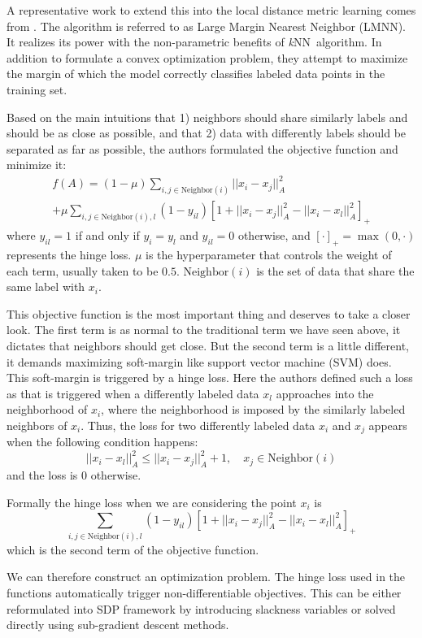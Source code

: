 \documentclass[12pt]{article}
\newcommand{\knn}{\textit{k}NN}
\begin{document}
A representative work to extend this into the local distance metric learning comes from \citet{weinberger2009distance}. The algorithm is referred to as Large Margin Nearest Neighbor (LMNN). It realizes its power with the non-parametric benefits of \knn\  algorithm. In addition to formulate a convex optimization problem, they attempt to maximize the margin of which the model correctly classifies labeled data points in the training set.

Based on the main intuitions that 1) neighbors should share similarly labels and should be as close as possible, and that 2) data with differently labels should be separated as far as possible, the authors formulated the objective function and minimize it:
\begin{multline}
f(A) = (1-\mu)\sum_{i,j\in\text{Neighbor}(i)}||x_i-x_j||_A^2 \\+ \mu\sum_{i,j\in\text{Neighbor}(i),l}(1-y_{il})\left[1+||x_i-x_j||_A^2-||x_i-x_l||_A^2\right]_+
\label{obj_l}
\end{multline}
where $y_{il}=1$ if and only if $y_i = y_l$ and $y_{il}=0$ otherwise, and $[\cdot]_+=\max(0,\cdot)$ represents the hinge loss. $\mu$ is the hyperparameter that controls the weight of each term, usually taken to be $0.5$. $\text{Neighbor}(i)$ is the set of data that share the same label with $x_i$.

This objective function is the most important thing and deserves to take a closer look. The first term is as normal to the traditional term we have seen above, it dictates that neighbors should get close. But the second term is a little different, it demands maximizing soft-margin like support vector machine (SVM) does. This soft-margin is triggered by a hinge loss. Here the authors defined such a loss as that is triggered when a differently labeled data $x_l$ approaches into the neighborhood of $x_i$, where the neighborhood is imposed by the similarly labeled neighbors of $x_i$. Thus, the loss for two differently labeled data $x_i$ and $x_j$ appears when the following condition happens:
\[||x_i-x_l||_A^2\leq ||x_i-x_j||_A^2 + 1, \quad x_j\in\text{Neighbor}(i)\]
and the loss is 0 otherwise.

Formally the hinge loss when we are considering the point $x_i$ is
\[\sum_{i,j\in\text{Neighbor}(i),l}(1-y_{il})\left[1+||x_i-x_j||_A^2-||x_i-x_l||_A^2\right]_+\]
which is the second term of the objective function.

We can therefore construct an optimization problem. The hinge loss used in the functions automatically trigger non-differentiable objectives. This can be either reformulated into SDP framework by introducing slackness variables or solved directly using sub-gradient descent methods. 
\end{document}
